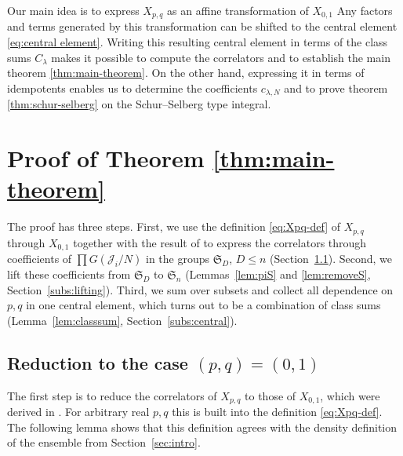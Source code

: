 \documentclass{article}
\theoremstyle{plain}
\theoremstyle{definition}
\numberwithin{equation}{section}
\begin{document}
Our main idea is to express $X_{p,q}$ as an affine transformation of $X_{0,1}$ Any factors and terms generated by this transformation can be shifted to the central element \eqref{eq:central element}. Writing this resulting central element in terms of the class sums $C_\lambda$ makes it possible to compute the correlators and to establish the main theorem \ref{thm:main-theorem}. On the other hand, expressing it in terms of idempotents enables us to determine the coefficients $c_{\lambda, N}$ and to prove theorem \ref{thm:schur-selberg} on the Schur--Selberg type integral.

\section{Proof of Theorem \ref{thm:main-theorem}}
\label{sec:main-thm-proof}


The proof has three steps. First, we use the definition \eqref{eq:Xpq-def} of $X_{p,q}$ through $X_{0,1}$ together with the result of \cite{gisonni2021jacobi}
to express the correlators through coefficients of
$\prod G(\mathcal{J}_i/N)$ in the groups $\mathfrak{S}_D$, $D\le n$
(Section~\ref{subs:reduction}). Second, we lift these coefficients from
$\mathfrak{S}_D$ to $\mathfrak{S}_n$ (Lemmas~\ref{lem:piS} and
\ref{lem:removeS}, Section~\ref{subs:lifting}). Third, we sum over subsets and
collect all dependence on $p,q$ in one central element, which turns out to be
a combination of class sums (Lemma~\ref{lem:classsum},
Section~\ref{subs:central}).

\subsection{Reduction to the case $(p,q)=(0,1)$}
\label{subs:reduction}

The first step is to reduce the correlators of $X_{p,q}$ to those of $X_{0,1}$, which were derived in \cite{gisonni2021jacobi}. For arbitrary real $p,q$ this is built into the definition \eqref{eq:Xpq-def}. The following lemma shows that this definition agrees with the density definition of the ensemble from Section~\ref{sec:intro}.
\end{document}
